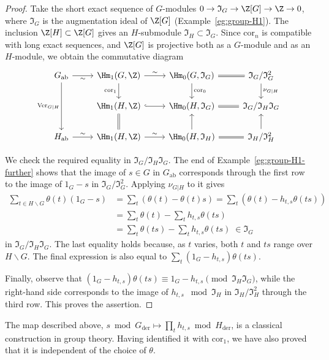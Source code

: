 \begin{proof}
	Take the short exact sequence of $G$-modules
	$0\to\mathfrak{I}_G\to\Z[G]\to\Z\to0$, where $\mathfrak{I}_G$ is the
	augmentation ideal of $\Z[G]$ (Example~\ref{eg:group-H1}). The inclusion
	$\Z[H]\subset\Z[G]$ gives an $H$-submodule
	$\mathfrak{I}_H\subset\mathfrak{I}_G$. Since $\mathrm{cor}_n$ is
	compatible with long exact sequences, and $\Z[G]$ is projective both as a
	$G$-module and as an $H$-module, we obtain the commutative diagram
	\[\begin{tikzcd}
		G_{\mathrm{ab}} \arrow[r, "\sim"'] \arrow[dd, "{\mathrm{Ver}_{G|H}}"'] &
		\Hm_1(G, \Z) \arrow[d, "{\mathrm{cor}_1}"'] \arrow[r, "\sim"] & \Hm_0(G, \mathfrak{I}_G) \arrow[d, "{\mathrm{cor}_0}"] \arrow[equal, r] &  \mathfrak{I}_G/\mathfrak{I}_G^2 \arrow[d, "{\nu_{G|H}}"] \\
		& \Hm_1(H, \Z) \arrow[equal, d] \arrow[hookrightarrow, r] & \Hm_0(H, \mathfrak{I}_G) \arrow[equal, r] & \mathfrak{I}_G / \mathfrak{I}_H \mathfrak{I}_G \\
		H_{\mathrm{ab}} \arrow[r, "\sim"] & \Hm_1(H, \Z) \arrow[r, "\sim"] & \Hm_0(H, \mathfrak{I}_H) \arrow[equal, r] \arrow[u] & \mathfrak{I}_H / \mathfrak{I}_H^2 \arrow[u]
	\end{tikzcd}\]

	We check the required equality in
	$\mathfrak{I}_G/\mathfrak{I}_H\mathfrak{I}_G$. The end of
	Example~\ref{eg:group-H1-further} shows that the image of $s\in G$ in
	$G_{\mathrm{ab}}$ corresponds through the first row to the image of
	$1_G-s$ in $\mathfrak{I}_G/\mathfrak{I}_G^2$. Applying
	$\nu_{G|H}$ to it gives
	\begin{align*}
		\sum_{t \in H \backslash G} \theta(t)(1_G - s) & = \sum_t (\theta(t) - \theta(t)s) = \sum_t (\theta(t) - h_{t, s}\theta(ts)) \\
		& = \sum_t \theta(t) - \sum_t h_{t, s} \theta(ts) \\
		& = \sum_t \theta(ts) - \sum_t h_{t, s} \theta(ts) \;\in \mathfrak{I}_G
	\end{align*}
	in $\mathfrak{I}_G/\mathfrak{I}_H\mathfrak{I}_G$. The last equality
	holds because, as $t$ varies, both $t$ and $ts$ range over
	$H\backslash G$. The final expression is also equal to
	$\sum_t(1_G-h_{t,s})\theta(ts)$.

	Finally, observe that
	$(1_G-h_{t,s})\theta(ts)\equiv1_G-h_{t,s}
	\pmod{\mathfrak{I}_H\mathfrak{I}_G}$, while the right-hand side
	corresponds to the image of $h_{t,s}\;\bmod\mathfrak{I}_H$ in
	$\mathfrak{I}_H/\mathfrak{I}_H^2$ through the third row. This proves the
	assertion.
\end{proof}

The map described above,
$s\bmod G_{\mathrm{der}}\mapsto\prod_t h_{t,s}\bmod H_{\mathrm{der}}$, is a
classical construction in group theory. Having identified it with
$\mathrm{cor}_1$, we have also proved that it is independent of the choice of
$\theta$.
